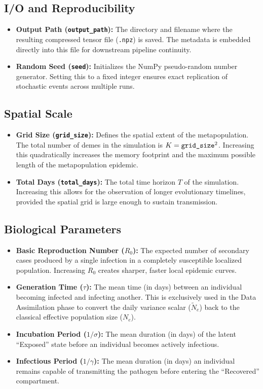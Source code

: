\documentclass[12pt]{article}
\begin{document}
\subsection{I/O and Reproducibility}
\begin{itemize}
    \item \textbf{Output Path (\texttt{output\_path}):} The directory and filename where the resulting compressed tensor file (\texttt{.npz}) is saved. The metadata is embedded directly into this file for downstream pipeline continuity.
    \item \textbf{Random Seed (\texttt{seed}):} Initializes the NumPy pseudo-random number generator. Setting this to a fixed integer ensures exact replication of stochastic events across multiple runs.
\end{itemize}

\subsection{Spatial Scale}
\begin{itemize}
    \item \textbf{Grid Size (\texttt{grid\_size}):} Defines the spatial extent of the metapopulation. The total number of demes in the simulation is $K = \text{\texttt{grid\_size}}^2$. Increasing this quadratically increases the memory footprint and the maximum possible length of the metapopulation epidemic.
    \item \textbf{Total Days (\texttt{total\_days}):} The total time horizon $T$ of the simulation. Increasing this allows for the observation of longer evolutionary timelines, provided the spatial grid is large enough to sustain transmission.
\end{itemize}

\subsection{Biological Parameters}
\begin{itemize}
    \item \textbf{Basic Reproduction Number ($R_0$):} The expected number of secondary cases produced by a single infection in a completely susceptible localized population. Increasing $R_0$ creates sharper, faster local epidemic curves.
    \item \textbf{Generation Time ($\tau$):} The mean time (in days) between an individual becoming infected and infecting another. This is exclusively used in the Data Assimilation phase to convert the daily variance scalar ($\tilde{N}_e$) back to the classical effective population size ($N_e$).
    \item \textbf{Incubation Period ($1/\sigma$):} The mean duration (in days) of the latent ``Exposed'' state before an individual becomes actively infectious.
    \item \textbf{Infectious Period ($1/\gamma$):} The mean duration (in days) an individual remains capable of transmitting the pathogen before entering the ``Recovered'' compartment.
\end{itemize}
\end{document}
